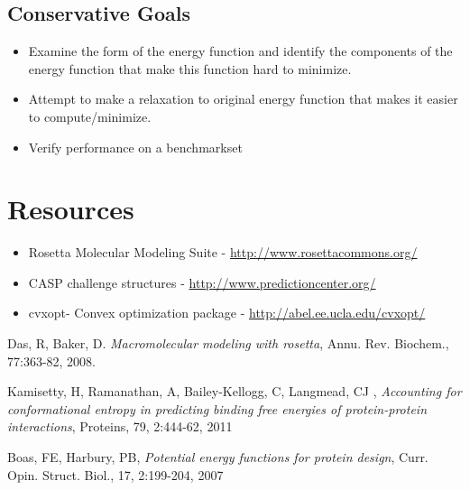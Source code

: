 \documentclass{article} %
\begin{document}
\subsection{Conservative Goals}
\begin{itemize}
\item Examine the form of the energy function and identify the components of the energy function that make this function hard to minimize.
\item Attempt to make a relaxation to original energy function that makes it easier to compute/minimize.
\item Verify performance on a benchmarkset
\end{itemize}


\section{Resources}
\begin{itemize}
\item Rosetta Molecular Modeling Suite - \url{http://www.rosettacommons.org/}
\item CASP challenge structures - \url{http://www.predictioncenter.org/}
\item cvxopt- Convex optimization package - \url{http://abel.ee.ucla.edu/cvxopt/}
\end{itemize}


\begin{thebibliography}{9}

	Das, R, Baker, D. 
	\emph{Macromolecular modeling with rosetta},
	Annu. Rev. Biochem., 77:363-82, 
	2008.
	
	Kamisetty, H, Ramanathan, A, Bailey-Kellogg, C, Langmead, CJ ,
	\emph{ Accounting for conformational entropy in predicting binding free energies of protein-protein interactions},
	 Proteins, 79, 2:444-62,
	2011

	Boas, FE, Harbury, PB,
	\emph{Potential energy functions for protein design},
	Curr. Opin. Struct. Biol., 17, 2:199-204, 
	2007
	
\end{thebibliography}
\end{document}
